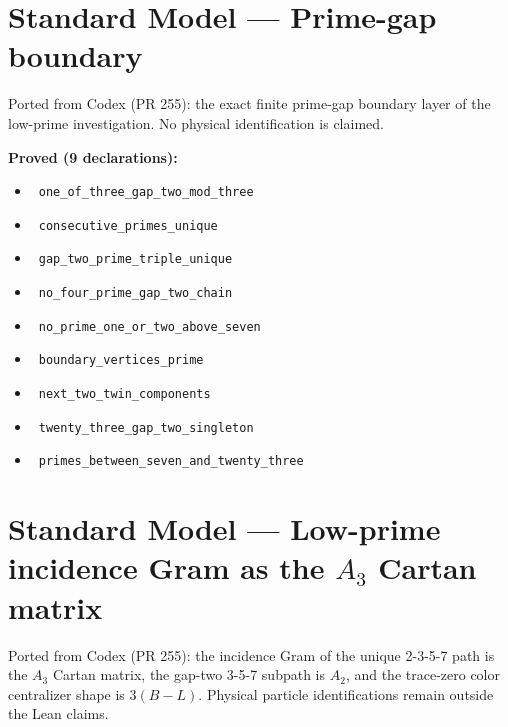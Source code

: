 \documentclass{report}
\theoremstyle{definition}
\begin{document}
\section{Standard Model --- Prime-gap boundary}
Ported from Codex (PR 255): the exact finite prime-gap boundary layer of the low-prime investigation. No physical identification is claimed.

\noindent\textbf{Proved (9 declarations):}
\begin{itemize}
  \item {}\leanok\ \texttt{one\_of\_three\_gap\_two\_mod\_three}
  \item {}\leanok\ \texttt{consecutive\_primes\_unique}
  \item {}\leanok\ \texttt{gap\_two\_prime\_triple\_unique}
  \item {}\leanok\ \texttt{no\_four\_prime\_gap\_two\_chain}
  \item {}\leanok\ \texttt{no\_prime\_one\_or\_two\_above\_seven}
  \item {}\leanok\ \texttt{boundary\_vertices\_prime}
  \item {}\leanok\ \texttt{next\_two\_twin\_components}
  \item {}\leanok\ \texttt{twenty\_three\_gap\_two\_singleton}
  \item {}\leanok\ \texttt{primes\_between\_seven\_and\_twenty\_three}
\end{itemize}

\section{Standard Model --- Low-prime incidence Gram as the $A_3$ Cartan matrix}
Ported from Codex (PR 255): the incidence Gram of the unique 2-3-5-7 path is the $A_3$ Cartan matrix, the gap-two 3-5-7 subpath is $A_2$, and the trace-zero color centralizer shape is $3(B-L)$. Physical particle identifications remain outside the Lean claims.
\end{document}
